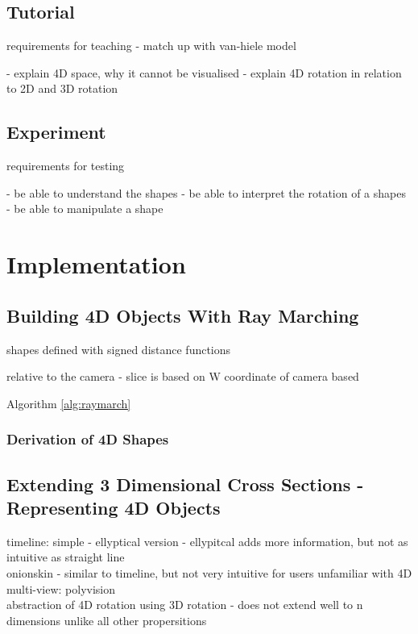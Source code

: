 \documentclass{l4proj}
\begin{document}
\section{Tutorial}

requirements for teaching
 - match up with van-hiele model

 - explain 4D space, why it cannot be visualised
 - explain 4D rotation in relation to 2D and 3D rotation

\section{Experiment}

requirements for testing

 - be able to understand the shapes
 - be able to interpret the rotation of a shapes
 - be able to manipulate a shape

\chapter{Implementation}

\section{Building 4D Objects With Ray Marching}

shapes defined with signed distance functions

relative to the camera - slice is based on W coordinate of camera based

\citep{the_art_of_code_writing_2019} %

Algorithm \ref{alg:raymarch}

\subsection{Derivation of 4D Shapes}

\citep{quilez_distance_nodate}
\citep{the_art_of_code_ray_2019} %

\section{Extending 3 Dimensional Cross Sections - Representing 4D Objects}

timeline: simple - ellyptical version
 - ellypitcal adds more information, but not as intuitive as straight line\\
onionskin - similar to timeline, but not very intuitive for users unfamiliar with 4D\\
multi-view: polyvision\\
abstraction of 4D rotation using 3D rotation - does not extend well to n dimensions unlike all other propersitions
\end{document}
